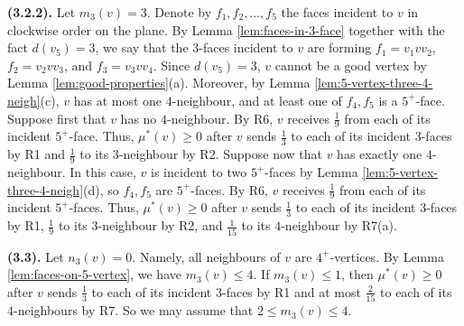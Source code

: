 \documentclass[12pt, reqno]{amsart}
\theoremstyle{plain}
\theoremstyle{definition}
\numberwithin{equation}{section}
\begin{document}
\textbf{(3.2.2).} Let $ m_3(v)=3$. Denote by $f_1,f_2,\ldots,f_5$ the faces incident to $v$ in clockwise order on the plane.  By Lemma \ref{lem:faces-in-3-face} together with the fact $d(v_5)=3$, we say that the $3$-faces incident to $v$ are forming $f_1=v_1vv_2$, $f_2=v_2vv_3$, and $f_3=v_3vv_4$. Since $d(v_5)=3$, $v$ cannot be a good vertex by Lemma \ref{lem:good-properties}(a). Moreover, by Lemma \ref{lem:5-vertex-three-4-neigh}(c), $v$ has at most one $4$-neighbour, and at least one of $f_4, f_5$ is a $5^+$-face. Suppose first that $v$ has no $4$-neighbour.  By R6, $v$ receives $\frac{1}{9}$ from each of its incident $5^+$-face. Thus,  $\mu^*(v)\geq 0$ after $v$ sends $\frac{1}{3}$ to each of its incident $3$-faces by R1 and $\frac{1}{9}$ to its $3$-neighbour by R2.   
Suppose now that  $v$ has exactly one $4$-neighbour. In this case, $v$ is incident to two $5^+$-faces by Lemma \ref{lem:5-vertex-three-4-neigh}(d), so $f_4, f_5$ are $5^+$-faces. By R6, $v$ receives $\frac{1}{9}$ from each of its incident $5^+$-faces. Thus,  $\mu^*(v)\geq 0$ after $v$ sends $\frac{1}{3}$ to each of its incident $3$-faces by R1, $\frac{1}{9}$ to its $3$-neighbour by R2, and $\frac{1}{15}$ to its $4$-neighbour by R7(a). \medskip


 
\textbf{(3.3).} Let $n_3(v)=0$. Namely, all neighbours of $v$ are $4^+$-vertices. By Lemma \ref{lem:faces-on-5-vertex}, we have $m_3(v)\leq 4$. If $m_3(v)\leq 1$, then $\mu^*(v)\geq 0$ after $v$ sends $\frac{1}{3}$ to each of its incident $3$-faces by R1 and at most $\frac{2}{15}$ to each of its $4$-neighbours by R7. So we may assume that $2\leq m_3(v)\leq 4$. \medskip
\end{document}
